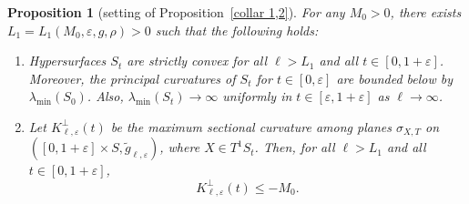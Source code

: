 \documentclass[JEP,XML,SOM,Unicode,NoFloatCountersInSection]{cedram}
\newtheorem{proposition}[theorem]{Proposition}
\theoremstyle{definition}
\let\eps\varepsilon
\renewcommand{\>}{{\rangle}}
\newcommand{\<}{{\langle}}
\begin{document}
\label{sec: normcurvC1C2}

\begin{proposition}[setting of Proposition~\ref{collar 1,2}]\label{prop: collar 1,2}
For any $M_0>0$, there exists $L_1=L_1(M_0, \eps, g, \rho)>0$ such that the following holds:
\begin{enumerate}
\item\label{convexity} Hypersurfaces $S_t$ are strictly convex for all $\ell>L_1$ and all $t\in[0,1+\eps]$. Moreover, the principal curvatures of $S_t$ for $t\in[0,\eps]$ are bounded below by $\lambda_{\min}(S_0)$. Also, $\lambda_{\min}(S_t)\to\infty$ uniformly in $t\in[\eps,1+\eps]$ as $\ell\to\infty$.
\item\label{normal} Let $K^\perp_{\ell,\eps}(t)$ be the maximum sectional curvature among planes $\sigma_{X,T}$ on \hbox{$([0,1+\eps]\times S, \tilde g_{\ell,\eps})$}, where $X\in T^1S_t$. Then, for all $\ell>L_1$ and all $t\in[0,1+\eps]$,
\begin{equation*}
K^\perp_{\ell,\eps}(t)\leq -M_0.
\end{equation*}
\end{enumerate}
\end{proposition}
\end{document}
